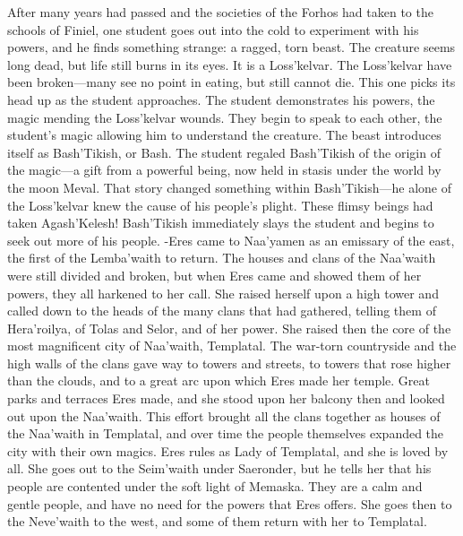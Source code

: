 \documentclass[smalldemyvopaper,11pt,twoside,onecolumn,openright,extrafontsizes]{memoir}
\begin{document}
After many years had passed and the societies of the Forhos had taken to the schools of Finiel, one student goes out into the cold to experiment with his powers, and he finds something strange: a ragged, torn beast. The creature seems long dead, but life still burns in its eyes. It is a Loss’kelvar. The Loss’kelvar have been broken—many see no point in eating, but still cannot die. This one picks its head up as the student approaches. The student demonstrates his powers, the magic mending the Loss’kelvar wounds. They begin to speak to each other, the student’s magic allowing him to understand the creature. The beast introduces itself as Bash'Tikish, or Bash. The student regaled Bash’Tikish of the origin of the magic—a gift from a powerful being, now held in stasis under the world by the moon Meval. That story changed something within Bash’Tikish—he alone of the Loss’kelvar knew the cause of his people’s plight. These flimsy beings had taken Agash’Kelesh! Bash’Tikish immediately slays the student and begins to seek out more of his people.
-Eres came to Naa’yamen as an emissary of the east, the first of the Lemba’waith to return. The houses and clans of the Naa’waith were still divided and broken, but when Eres came and showed them of her powers, they all harkened to her call. She raised herself upon a high tower and called down to the heads of the many clans that had gathered, telling them of Hera’roilya, of Tolas and Selor, and of her power. She raised then the core of the most magnificent city of Naa’waith, Templatal. The war-torn countryside and the high walls of the clans gave way to towers and streets, to towers that rose higher than the clouds, and to a great arc upon which Eres made her temple. Great parks and terraces Eres made, and she stood upon her balcony then and looked out upon the Naa’waith. This effort brought all the clans together as houses of the Naa’waith in Templatal, and over time the people themselves expanded the city with their own magics. Eres rules as Lady of Templatal, and she is loved by all. She goes out to the Seim’waith under Saeronder, but he tells her that his people are contented under the soft light of Memaska. They are a calm and gentle people, and have no need for the powers that Eres offers. She goes then to the Neve’waith to the west, and some of them return with her to Templatal.
\end{document}
